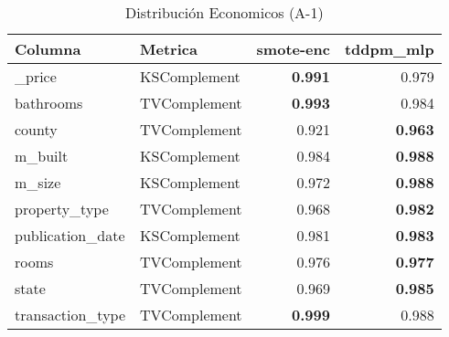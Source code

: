 \begin{table}[H]
\centering
\caption{Distribución Economicos (A-1)}
\label{table-shape-economicos-a-1}
\begin{tabular}{|l|l|r|r|}
\hline
\rowcolor[gray]{0.8}
Columna & Metrica & smote-enc & tddpm\_mlp \\
\hline \_price & KSComplement & \bfseries 0.991 & 0.979 \\
\hline bathrooms & TVComplement & \bfseries 0.993 & 0.984 \\
\hline county & TVComplement & 0.921 & \bfseries 0.963 \\
\hline m\_built & KSComplement & 0.984 & \bfseries 0.988 \\
\hline m\_size & KSComplement & 0.972 & \bfseries 0.988 \\
\hline property\_type & TVComplement & 0.968 & \bfseries 0.982 \\
\hline publication\_date & KSComplement & 0.981 & \bfseries 0.983 \\
\hline rooms & TVComplement & 0.976 & \bfseries 0.977 \\
\hline state & TVComplement & 0.969 & \bfseries 0.985 \\
\hline transaction\_type & TVComplement & \bfseries 0.999 & 0.988 \\
\hline
\end{tabular}
\end{table}
